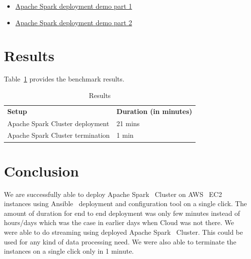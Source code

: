 \begin{itemize}
	\item
        \href{https://d1b10bmlvqabco.cloudfront.net/attach/%
        jbkvbp3ed3m2ez/j6r57sr2IDo/jgenhk1lk5ly/%
        hidsp18511\_AWS\_EC2\_Deployment\_1.mp4}
        {Apache Spark deployment demo part 1}
        \item
        \href{https://d1b10bmlvqabco.cloudfront.net/attach/%
        jbkvbp3ed3m2ez/j6r57sr2IDo/jgeniacbvn7m/%
        hidsp18511\_AWS\_EC2\_Deployment\_2.mp4}
        {Apache	Spark deployment demo part 2}
\end{itemize}

\section{Results}

Table~\ref{t:results-table} provides the benchmark results.


\begin{table}[htb]
	\centering
	\caption{Results}\label{t:results-table}
	\begin{tabular}{ll} 
		\textbf{Setup} & \textbf{Duration (in minutes)} \\ 
		Apache Spark Cluster deployment  & 21 mins \\
		Apache Spark Cluster termination & 1 min \\
	\end{tabular}
\end{table}





\section{Conclusion}

We are successfully able to deploy Apache
Spark~\cite{hid-sp18-511-www-spark} Cluster on
AWS~\cite{hid-sp18-511-www-aws} EC2~\cite{hid-sp18-511-www-ec2}
instances using Ansible~\cite{hid-sp18-511-www-ansible} deployment and
configuration tool on a single click. The amount of duration for end
to end deployment was only few minutes instead of hours/days which was
the case in earlier days when Cloud was not there. We were able to do
streaming using deployed Apache Spark~\cite{hid-sp18-511-www-spark}
Cluster. This could be used for any kind of data processing need. We
were also able to terminate the instances on a single click only in 1
minute.

